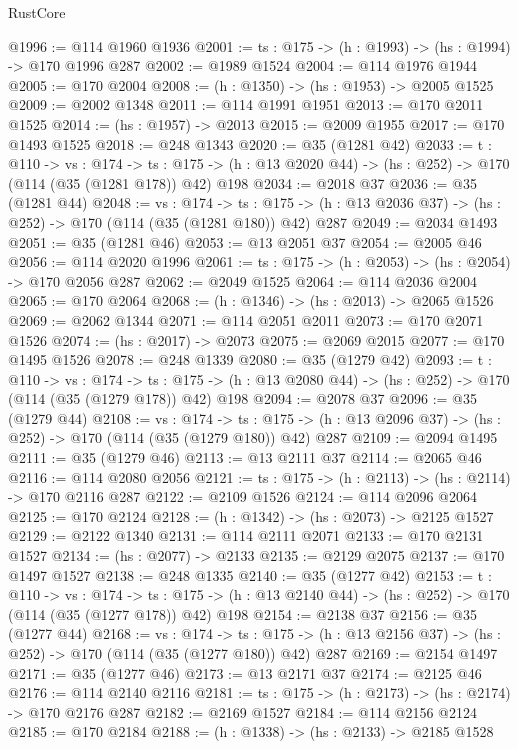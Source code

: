 \begin{lexlean}{RustCore}
\begin{coremodule}
@1996 := @114 @1960 @1936
@2001 := {ts : @175} -> (h : @1993) -> (hs : @1994) -> @170 @1996 @287
@2002 := @1989 @1524
@2004 := @114 @1976 @1944
@2005 := @170 @2004
@2008 := (h : @1350) -> (hs : @1953) -> @2005 @1525
@2009 := @2002 @1348
@2011 := @114 @1991 @1951
@2013 := @170 @2011 @1525
@2014 := (hs : @1957) -> @2013
@2015 := @2009 @1955
@2017 := @170 @1493 @1525
@2018 := @248 @1343
@2020 := @35 (@1281 @42)
@2033 := {t : @110} ->
  {vs : @174} ->
  {ts : @175} -> (h : @13 @2020 @44) -> (hs : @252) -> @170 (@114 (@35 (@1281 @178)) @42) @198
@2034 := @2018 @37
@2036 := @35 (@1281 @44)
@2048 := {vs : @174} ->
  {ts : @175} -> (h : @13 @2036 @37) -> (hs : @252) -> @170 (@114 (@35 (@1281 @180)) @42) @287
@2049 := @2034 @1493
@2051 := @35 (@1281 @46)
@2053 := @13 @2051 @37
@2054 := @2005 @46
@2056 := @114 @2020 @1996
@2061 := {ts : @175} -> (h : @2053) -> (hs : @2054) -> @170 @2056 @287
@2062 := @2049 @1525
@2064 := @114 @2036 @2004
@2065 := @170 @2064
@2068 := (h : @1346) -> (hs : @2013) -> @2065 @1526
@2069 := @2062 @1344
@2071 := @114 @2051 @2011
@2073 := @170 @2071 @1526
@2074 := (hs : @2017) -> @2073
@2075 := @2069 @2015
@2077 := @170 @1495 @1526
@2078 := @248 @1339
@2080 := @35 (@1279 @42)
@2093 := {t : @110} ->
  {vs : @174} ->
  {ts : @175} -> (h : @13 @2080 @44) -> (hs : @252) -> @170 (@114 (@35 (@1279 @178)) @42) @198
@2094 := @2078 @37
@2096 := @35 (@1279 @44)
@2108 := {vs : @174} ->
  {ts : @175} -> (h : @13 @2096 @37) -> (hs : @252) -> @170 (@114 (@35 (@1279 @180)) @42) @287
@2109 := @2094 @1495
@2111 := @35 (@1279 @46)
@2113 := @13 @2111 @37
@2114 := @2065 @46
@2116 := @114 @2080 @2056
@2121 := {ts : @175} -> (h : @2113) -> (hs : @2114) -> @170 @2116 @287
@2122 := @2109 @1526
@2124 := @114 @2096 @2064
@2125 := @170 @2124
@2128 := (h : @1342) -> (hs : @2073) -> @2125 @1527
@2129 := @2122 @1340
@2131 := @114 @2111 @2071
@2133 := @170 @2131 @1527
@2134 := (hs : @2077) -> @2133
@2135 := @2129 @2075
@2137 := @170 @1497 @1527
@2138 := @248 @1335
@2140 := @35 (@1277 @42)
@2153 := {t : @110} ->
  {vs : @174} ->
  {ts : @175} -> (h : @13 @2140 @44) -> (hs : @252) -> @170 (@114 (@35 (@1277 @178)) @42) @198
@2154 := @2138 @37
@2156 := @35 (@1277 @44)
@2168 := {vs : @174} ->
  {ts : @175} -> (h : @13 @2156 @37) -> (hs : @252) -> @170 (@114 (@35 (@1277 @180)) @42) @287
@2169 := @2154 @1497
@2171 := @35 (@1277 @46)
@2173 := @13 @2171 @37
@2174 := @2125 @46
@2176 := @114 @2140 @2116
@2181 := {ts : @175} -> (h : @2173) -> (hs : @2174) -> @170 @2176 @287
@2182 := @2169 @1527
@2184 := @114 @2156 @2124
@2185 := @170 @2184
@2188 := (h : @1338) -> (hs : @2133) -> @2185 @1528

\end{coremodule}
\end{lexlean}
